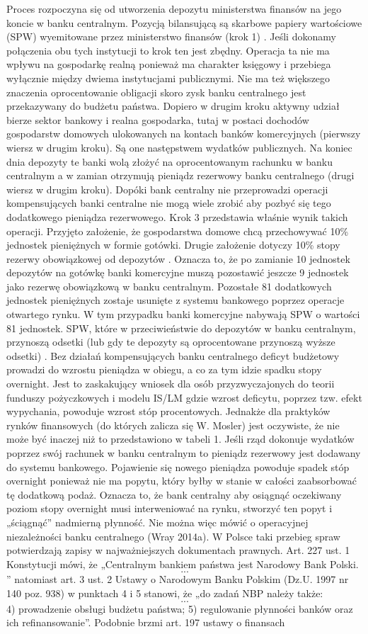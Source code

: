 \documentclass[
]{book}
\begin{document}
Proces rozpoczyna się od utworzenia depozytu ministerstwa finansów na jego koncie w banku centralnym. Pozycją bilansującą są skarbowe papiery wartościowe (SPW) wyemitowane przez ministerstwo finansów (krok 1) . Jeśli dokonamy połączenia obu tych instytucji to krok ten jest zbędny. Operacja ta nie ma wpływu na gospodarkę realną ponieważ ma charakter księgowy i przebiega wyłącznie między dwiema instytucjami publicznymi. Nie ma też większego znaczenia oprocentowanie obligacji skoro zysk banku centralnego jest przekazywany do budżetu państwa. Dopiero w drugim kroku aktywny udział bierze sektor bankowy i realna gospodarka, tutaj w postaci dochodów gospodarstw domowych ulokowanych na kontach banków komercyjnych (pierwszy wiersz w drugim kroku). Są one następstwem wydatków publicznych. Na koniec dnia depozyty te banki wolą złożyć na oprocentowanym rachunku w banku centralnym a w zamian otrzymują pieniądz rezerwowy banku centralnego (drugi wiersz w drugim kroku). Dopóki bank centralny nie przeprowadzi operacji kompensujących banki centralne nie mogą wiele zrobić aby pozbyć się tego dodatkowego pieniądza rezerwowego. Krok 3 przedstawia właśnie wynik takich operacji. Przyjęto założenie, że gospodarstwa domowe chcą przechowywać 10\% jednostek pieniężnych w formie gotówki. Drugie założenie dotyczy 10\% stopy rezerwy obowiązkowej od depozytów . Oznacza to, że po zamianie 10 jednostek depozytów na gotówkę banki komercyjne muszą pozostawić jeszcze 9 jednostek jako rezerwę obowiązkową w banku centralnym. Pozostałe 81 dodatkowych jednostek pieniężnych zostaje usunięte z systemu bankowego poprzez operacje otwartego rynku. W tym przypadku banki komercyjne nabywają SPW o wartości 81 jednostek. SPW, które w przeciwieństwie do depozytów w banku centralnym, przynoszą odsetki (lub gdy te depozyty są oprocentowane przynoszą wyższe odsetki) . Bez działań kompensujących banku centralnego deficyt budżetowy prowadzi do wzrostu pieniądza w obiegu, a co za tym idzie spadku stopy overnight. Jest to zaskakujący wniosek dla osób przyzwyczajonych do teorii funduszy pożyczkowych i modelu IS/LM gdzie wzrost deficytu, poprzez tzw. efekt wypychania, powoduje wzrost stóp procentowych. Jednakże dla praktyków rynków finansowych (do których zalicza się W. Mosler) jest oczywiste, że nie może być inaczej niż to przedstawiono w tabeli 1. Jeśli rząd dokonuje wydatków poprzez swój rachunek w banku centralnym to pieniądz rezerwowy jest dodawany do systemu bankowego. Pojawienie się nowego pieniądza powoduje spadek stóp overnight ponieważ nie ma popytu, który byłby w stanie w całości zaabsorbować tę dodatkową podaż. Oznacza to, że bank centralny aby osiągnąć oczekiwany poziom stopy overnight musi interweniować na rynku, stworzyć ten popyt i „ściągnąć'' nadmierną płynność. Nie można więc mówić o operacyjnej niezależności banku centralnego (Wray 2014a). W Polsce taki przebieg spraw potwierdzają zapisy w najważniejszych dokumentach prawnych. Art. 227 ust. 1 Konstytucji mówi, że „Centralnym bankiem państwa jest Narodowy Bank Polski.\[...\]'' natomiast art. 3 ust. 2 Ustawy o Narodowym Banku Polskim (Dz.U. 1997 nr 140 poz. 938) w punktach 4 i 5 stanowi, że „do zadań NBP należy także: \[...\] 4) prowadzenie obsługi budżetu państwa; 5) regulowanie płynności banków oraz ich refinansowanie''. Podobnie brzmi art. 197 ustawy o finansach 
\end{document}
